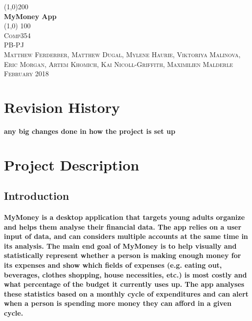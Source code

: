 \documentclass{article}
\begin{document}
\begin {titlepage}
    \begin{center}
   \line(1,0){200} \\
    \huge{\bfseries MyMoney App}\\
    \line (1,0) {100} \\
    [1.5cm]
    \textsc{\LARGE Comp354}\\
    [1cm]
    \textsc{\large PB-PJ}\\
    [3 cm]
    \textsc{\large Matthew Ferderber, Matthew Dugal, Mylene Haurie, Viktoriya Malinova, Eric Morgan, Artem Khomich, \break Kai Nicoll-Griffith, Maximilien Malderle }\\
    [6cm]
    \textsc{\large February 2018}\\

    \end{center}
\end{titlepage}

\fontsize{11pt}{13pt}\selectfont
\setlength{\parindent}{13 pt}

\newpage
 \section {Revision History}
 \paragraph{\indent any big changes done in how the project is set up}
 
\newpage
\tableofcontents


\newpage
\section {Project Description}

\subsection{Introduction}
\paragraph{\indent MyMoney is a desktop application that targets young adults organize and helps them analyse their financial data. The app relies on a user input of data, and can considers multiple accounts at the same time in its analysis. The main end goal of MyMoney is to help visually and statistically represent whether a person is making enough money for its expenses and show which fields of expenses (e.g. eating out, beverages, clothes shopping, house necessities, etc.) is most costly and what percentage of the budget it currently uses up. The app analyses these statistics based on a monthly cycle of expenditures and can alert when a person is spending more money they can afford in a given cycle. }
\end{document}
